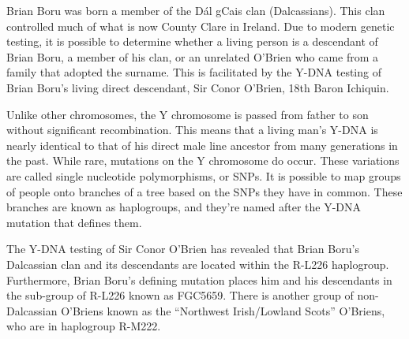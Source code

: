 Brian Boru was born a member of the D\'{a}l gCais clan (Dalcassians). This clan controlled much of what is now County Clare in Ireland.\cite{BoruEarlyHistory} Due to modern genetic testing, it is possible to determine whether a living person is a descendant of Brian Boru, a member of his clan, or an unrelated O'Brien who came from a family that adopted the surname. This is facilitated by the Y-DNA testing of Brian Boru's living direct descendant, Sir Conor O'Brien, 18th Baron Ichiquin.\cite{GGI:1}

Unlike other chromosomes, the Y chromosome is passed from father to son without significant recombination. This means that a living man's Y-DNA is nearly identical to that of his direct male line ancestor from many generations in the past. While rare, mutations on the Y chromosome do occur. These variations are called single nucleotide polymorphisms, or SNPs. It is possible to map groups of people onto branches of a tree based on the SNPs they have in common. These branches are known as haplogroups, and they're named after the Y-DNA mutation that defines them.\cite{Bettinger}

The Y-DNA testing of Sir Conor O'Brien has revealed that Brian Boru's Dalcassian clan and its descendants are located within the R-L226 haplogroup. Furthermore, Brian Boru's defining mutation places him and his descendants in the sub-group of R-L226 known as FGC5659. There is another group of non-Dalcassian O'Briens known as the ``Northwest Irish/Lowland Scots'' O'Briens, who are in haplogroup R-M222.\cite{GGI:2}

